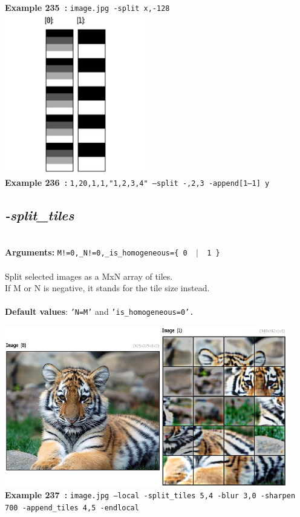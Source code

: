 \documentclass[a4paper,11pt,twoside]{book}
\begin{document}
\begin{center}
{\footnotesize \textbf{Example 235~:} \texttt{image.jpg -split x,-128}}
\\\includegraphics[keepaspectratio=true,height=7cm,width=\textwidth]{img/gmic_def236.jpg}\\
{\footnotesize \textbf{Example 236~:} \texttt{1,20,1,1,"1,2,3,4" --split -,2,3 -append[1--1] y}}
\end{center}

\subsection{\emph{-split\_tiles} }\vspace*{-0.5em}
~\\\textbf{Arguments: } 
{\small \texttt{M!=0,\_N!=0,\_is\_homogeneous=\{ 0 ~$|$~ 1 \}}}\\~\\
Split selected images as a MxN array of tiles.
~\\If M or N is negative, it stands for the tile size instead.
~\\~\\\textbf{Default values}: {\small \texttt{'N=M'} and \texttt{'is\_homogeneous=0'.}}
\begin{center}\includegraphics[keepaspectratio=true,height=7cm,width=\textwidth]{img/gmic_def237.jpg}\\
{\footnotesize \textbf{Example 237~:} \texttt{image.jpg --local -split\_tiles 5,4 -blur 3,0 -sharpen 700 -append\_tiles 4,5 -endlocal}}
\end{center}
\end{document}
